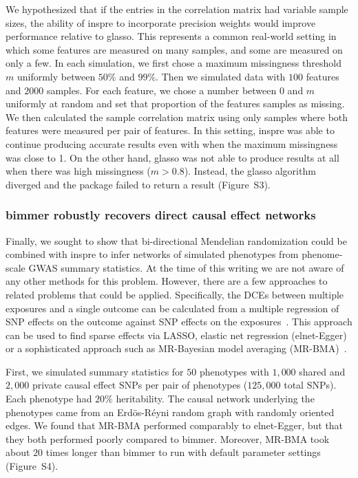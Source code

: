 \documentclass{article}
\begin{document}
We hypothesized that if the entries in the correlation matrix had variable
sample sizes, the ability of inspre to incorporate precision weights would improve
performance relative to glasso. This represents a common real-world setting in
which some features are measured on many samples, and some are measured
on only a few. In each simulation, we first chose a maximum missingness
threshold $m$ uniformly between $50\%$ and $99\%$. Then we simulated data with
$100$ features and $2000$ samples. For each feature, we chose
a number between $0$ and $m$ uniformly at random and set that proportion of the features
samples as missing. We then calculated the sample correlation matrix using only
samples where both features were measured per pair of features.
In this setting, inspre was able to continue producing accurate
results even with when the maximum missingness was close to 1. On the other
hand, glasso was not able to produce results at all when there was high
missingness ($m > 0.8$). Instead, the glasso algorithm diverged and the package failed to return a result (Figure~S3).

\subsubsection*{bimmer robustly recovers direct causal effect networks}

Finally, we sought to show that bi-directional Mendelian randomization
could be combined with inspre to infer networks of simulated phenotypes
from phenome-scale GWAS summary statistics. At the time of this writing
we are not aware of any other methods for this problem. However,
there are a few approaches to related problems that could be applied.
Specifically, the DCEs between multiple exposures and a single outcome
can be calculated from a multiple regression of SNP effects on the outcome
against SNP effects on the exposures~\cite{Burgess2015a}. This approach can be used
to find sparse effects via LASSO, elastic net regression (elnet-Egger) or a sophisticated approach such as MR-Bayesian model averaging (MR-BMA)~\cite{Zuber2020}.

First, we simulated summary
statistics for $50$ phenotypes with $1,000$ shared and $2,000$ private
causal effect SNPs per pair of phenotypes ($125,000$ total SNPs). Each
phenotype had $20\%$ heritability. The causal
network underlying the phenotypes came from an Erd\"os-R\'eyni random graph with
randomly oriented edges. We found that MR-BMA performed comparably to
elnet-Egger, but that they both performed poorly compared to bimmer.
Moreover, MR-BMA took about $20$ times longer than bimmer to run with
default parameter settings (Figure~S4).
\end{document}
